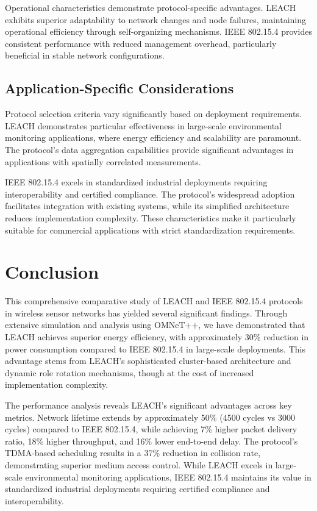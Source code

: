 \documentclass[conference]{IEEEtran}
\begin{document}
Operational characteristics demonstrate protocol-specific advantages. LEACH exhibits superior adaptability to network changes and node failures, maintaining operational efficiency through self-organizing mechanisms. IEEE 802.15.4 provides consistent performance with reduced management overhead, particularly beneficial in stable network configurations.


\newpage
\subsection{Application-Specific Considerations}
Protocol selection criteria vary significantly based on deployment requirements. LEACH demonstrates particular effectiveness in large-scale environmental monitoring applications, where energy efficiency and scalability are paramount. The protocol's data aggregation capabilities provide significant advantages in applications with spatially correlated measurements.

IEEE 802.15.4 excels in standardized industrial deployments requiring interoperability and certified compliance. The protocol's widespread adoption facilitates integration with existing systems, while its simplified architecture reduces implementation complexity. These characteristics make it particularly suitable for commercial applications with strict standardization requirements.

\section{Conclusion}

This comprehensive comparative study of LEACH and IEEE 802.15.4 protocols in wireless sensor networks has yielded several significant findings. Through extensive simulation and analysis using OMNeT++, we have demonstrated that LEACH achieves superior energy efficiency, with approximately 30\% reduction in power consumption compared to IEEE 802.15.4 in large-scale deployments. This advantage stems from LEACH's sophisticated cluster-based architecture and dynamic role rotation mechanisms, though at the cost of increased implementation complexity.

The performance analysis reveals LEACH's significant advantages across key metrics. Network lifetime extends by approximately 50\% (4500 cycles vs 3000 cycles) compared to IEEE 802.15.4, while achieving 7\% higher packet delivery ratio, 18\% higher throughput, and 16\% lower end-to-end delay. The protocol's TDMA-based scheduling results in a 37\% reduction in collision rate, demonstrating superior medium access control. While LEACH excels in large-scale environmental monitoring applications, IEEE 802.15.4 maintains its value in standardized industrial deployments requiring certified compliance and interoperability.
\end{document}
